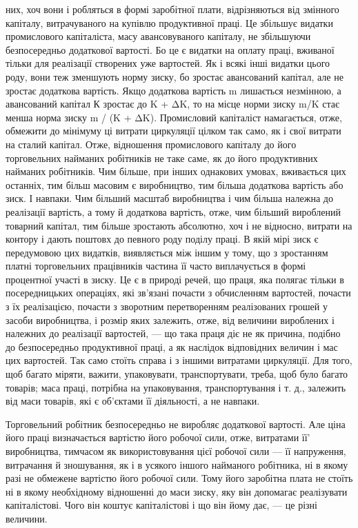 \parcont{}  %
них, хоч вони і робляться в формі заробітної плати, відрізняються
від змінного капіталу, витрачуваного на купівлю продуктивної
праці. Це збільшує видатки промислового капіталіста, масу
авансовуваного капіталу, не збільшуючи безпосередньо додаткової
вартості. Бо це є видатки на оплату праці, вживаної тільки
для реалізації створених уже вартостей. Як і всякі інші видатки
цього роду, вони теж зменшують норму зиску, бо зростає авансований
капітал, але не зростає додаткова вартість. Якщо додаткова
вартість m лишається незмінною, а авансований капітал К
зростає до K + ΔK, то на місце норми зиску m/K стає менша норма
зиску m / (K + ΔK). Промисловий капіталіст намагається, отже, обмежити
до мінімуму ці витрати циркуляції цілком так само, як і
свої витрати на сталий капітал. Отже, відношення промислового
капіталу до його торговельних найманих робітників не таке саме,
як до його продуктивних найманих робітників. Чим більше, при
інших однакових умовах, вживається цих останніх, тим більш
масовим є виробництво, тим більша додаткова вартість або зиск.
І навпаки. Чим більший масштаб виробництва і чим більша належна
до реалізації вартість, а тому й додаткова вартість, отже,
чим більший вироблений товарний капітал, тим більше зростають
абсолютно, хоч і не відносно, витрати на контору і дають поштовх
до певного роду поділу праці. В якій мірі зиск є передумовою
цих видатків, виявляється між іншим у тому, що з зростанням
платні торговельних працівників частина її часто виплачується
в формі процентної участі в зиску. Це є в природі
речей, що праця, яка полягає тільки в посередницьких операціях,
які зв’язані почасти з обчисленням вартостей, почасти з їх реалізацією,
почасти з зворотним перетворенням реалізованих грошей
у засоби виробництва, і розмір яких залежить, отже, від
величини вироблених і належних до реалізації вартостей, — що
така праця діє не як причина, подібно до безпосередньо продуктивної
праці, а як наслідок відповідних величин і мас цих вартостей.
Так само стоїть справа і з іншими витратами циркуляції.
Для того, щоб багато міряти, важити, упаковувати, транспортувати,
треба, щоб було багато товарів; маса праці, потрібна на
упаковування, транспортування і т. д., залежить від маси товарів,
які є об’єктами її діяльності, а не навпаки.

Торговельний робітник безпосередньо не виробляє додаткової
вартості. Але ціна його праці визначається вартістю його
робочої сили, отже, витратами її' виробництва, тимчасом як
використовування цієї робочої сили — її напруження, витрачання
й зношування, як і в усякого іншого найманого робітника, ні в
якому разі не обмежене вартістю його робочої сили. Тому його
заробітна плата не стоїть ні в якому необхідному відношенні
до маси зиску, яку він допомагає реалізувати капіталістові. Чого
він коштує капіталістові і що він йому дає, — це різні величини.
\parbreak{}  %
